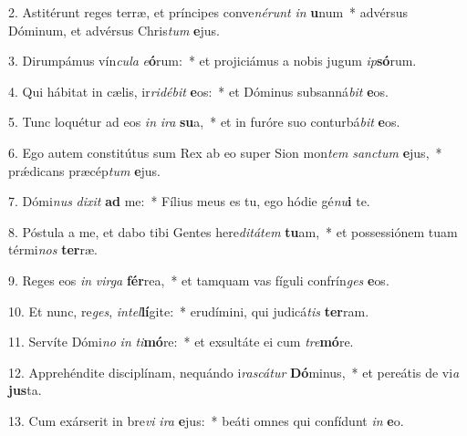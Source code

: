 2. Astitérunt reges terræ, et príncipes conve\textit{né}\textit{runt} \textit{in} \textbf{u}num~*  advérsus Dóminum, et advérsus Chris\textit{tum} \textbf{e}jus.\

3. Dirumpámus vín\textit{cu}\textit{la} \textit{e}\textbf{ó}rum:~*  et projiciámus a nobis jugum \textit{ip}\textbf{só}rum.\

4. Qui hábitat in cælis, ir\textit{ri}\textit{dé}\textit{bit} \textbf{e}os:~*  et Dóminus subsanná\textit{bit} \textbf{e}os.\

5. Tunc loquétur ad eos \textit{in} \textit{i}\textit{ra} \textbf{su}a,~*  et in furóre suo conturbá\textit{bit} \textbf{e}os.\

6. Ego autem constitútus sum Rex ab eo super Sion mon\textit{tem} \textit{sanc}\textit{tum} \textbf{e}jus,~*  prǽdicans præcép\textit{tum} \textbf{e}jus.\

7. Dómi\textit{nus} \textit{di}\textit{xit} \textbf{ad} me:~*  Fílius meus es tu, ego hódie gé\textit{nu}\textbf{i} te.\

8. Póstula a me, et dabo tibi Gentes here\textit{di}\textit{tá}\textit{tem} \textbf{tu}am,~*  et possessiónem tuam térmi\textit{nos} \textbf{ter}ræ.\

9. Reges eos \textit{in} \textit{vir}\textit{ga} \textbf{fér}rea,~*  et tamquam vas fíguli confrín\textit{ges} \textbf{e}os.\

10. Et nunc, re\textit{ges}, \textit{in}\textit{tel}\textbf{lí}gite:~*  erudímini, qui judicá\textit{tis} \textbf{ter}ram.\

11. Servíte Dómi\textit{no} \textit{in} \textit{ti}\textbf{mó}re:~*  et exsultáte ei cum \textit{tre}\textbf{mó}re.\

12. Apprehéndite disciplínam, nequándo i\textit{ras}\textit{cá}\textit{tur} \textbf{Dó}minus,~*  et pereátis de vi\textit{a} \textbf{jus}ta.\

13. Cum exárserit in bre\textit{vi} \textit{i}\textit{ra} \textbf{e}jus:~*  beáti omnes qui confídunt \textit{in} \textbf{e}o.\

